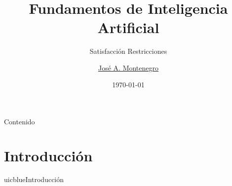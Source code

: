 \documentclass[xcolor=table]{beamer}
\title{Fundamentos de Inteligencia Artificial}
\subtitle{Satisfacción Restricciones}
\author{\href{mailto:jmmontes@uma.es}{José A. Montenegro}}
\date{\today}
\begin{document}
\newtheorem{mydef}{Definición}[section] %
\maketitle






\begin{frame}{Contenido}
\tableofcontents
\end{frame}



\section{Introducción}

\begin{chapter}{uicblue}{Introducción}
\end{chapter}


\end{document}
